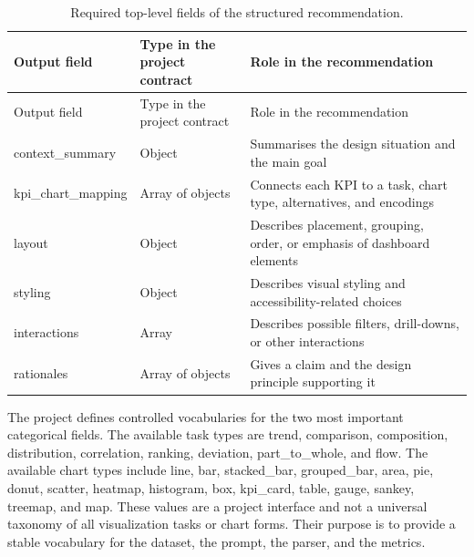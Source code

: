 \begingroup\footnotesize\setlength{\tabcolsep}{3pt}\sloppy
\begin{longtable}[]{@{}
  >{\raggedright\arraybackslash}p{}
  >{\raggedright\arraybackslash}p{}
  >{\raggedright\arraybackslash}p{}@{}}
\caption{Required top-level fields of the structured recommendation.}\tabularnewline
\toprule\noalign{}
\begin{minipage}[b]{\linewidth}\raggedright
Output field
\end{minipage} & \begin{minipage}[b]{\linewidth}\raggedright
Type in the project contract
\end{minipage} & \begin{minipage}[b]{\linewidth}\raggedright
Role in the recommendation
\end{minipage} \\
\midrule\noalign{}
\endfirsthead
\toprule\noalign{}
\begin{minipage}[b]{\linewidth}\raggedright
Output field
\end{minipage} & \begin{minipage}[b]{\linewidth}\raggedright
Type in the project contract
\end{minipage} & \begin{minipage}[b]{\linewidth}\raggedright
Role in the recommendation
\end{minipage} \\
\midrule\noalign{}
\endhead
\bottomrule\noalign{}
\endlastfoot
context\_summary & Object & Summarises the design situation and the main goal \\
kpi\_chart\_mapping & Array of objects & Connects each KPI to a task, chart type, alternatives, and encodings \\
layout & Object & Describes placement, grouping, order, or emphasis of dashboard elements \\
styling & Object & Describes visual styling and accessibility-related choices \\
interactions & Array & Describes possible filters, drill-downs, or other interactions \\
rationales & Array of objects & Gives a claim and the design principle supporting it \\
\end{longtable}
\endgroup

The project defines controlled vocabularies for the two most important categorical fields. The available task types are trend, comparison, composition, distribution, correlation, ranking, deviation, part\_to\_whole, and flow. The available chart types include line, bar, stacked\_bar, grouped\_bar, area, pie, donut, scatter, heatmap, histogram, box, kpi\_card, table, gauge, sankey, treemap, and map. These values are a project interface and not a universal taxonomy of all visualization tasks or chart forms. Their purpose is to provide a stable vocabulary for the dataset, the prompt, the parser, and the metrics.

